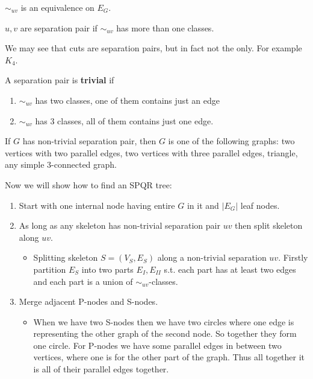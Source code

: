 \begin{fact}
	$\sim_{uv}$ is an equivalence on $E_G$.
\end{fact}

\begin{defn}
	$u,v$ are separation pair if $\sim_{uv}$ has more than one classes.
\end{defn}

We may see that cuts are separation pairs, but in fact not the only. For example $K_4$.

\begin{defn}
	A separation pair is \textbf{trivial} if
	
	\begin{enumerate}
		\item $\sim_{uv}$ has two classes, one of them contains just an edge
		\item $\sim_{uv}$ has 3 classes, all of them contains just one edge.
	\end{enumerate}
\end{defn}

\begin{observ}
	If $G$ has non-trivial separation pair, then $G$ is one of the following graphs: two vertices with two parallel edges, two vertices with three parallel edges, triangle, any simple 3-connected graph.
\end{observ}

\noindent Now we will show how to find an SPQR tree:

\begin{enumerate}
	\item Start with one internal node having entire $G$ in it and $|E_G|$ leaf nodes.
	\item As long as any skeleton has non-trivial separation pair $uv$ then split skeleton along $uv$.
	
	\begin{itemize}
		\item Splitting skeleton $S = (V_S, E_S)$ along a non-trivial separation $uv$. Firstly partition $E_S$ into two parts $E_{I}, E_{II}$ s.t. each part has at least two edges and each part is a union of $\sim_{uv}$-classes.
	\end{itemize}
	
	\item Merge adjacent P-nodes and S-nodes.
	
	\begin{itemize}
		\item When we have two S-nodes then we have two circles where one edge is representing the other graph of the second node. So together they form one circle. For P-nodes we have some parallel edges in between two vertices, where one is for the other part of the graph. Thus all together it is all of their parallel edges together.
	\end{itemize}
\end{enumerate}

